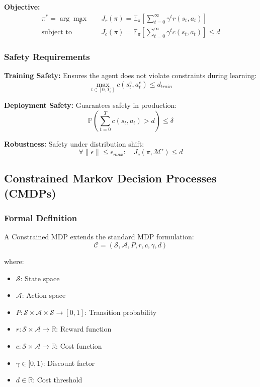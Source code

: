 \documentclass[12pt]{article}
\begin{document}
{{{{\textbf{Objective:}
\begin{align}
\pi^* = \arg\max_{\pi} \quad & J_r(\pi) = \mathbb{E}_{\pi}\left[\sum_{t=0}^{\infty} \gamma^t r(s_t, a_t)\right] \\
\text{subject to} \quad & J_c(\pi) = \mathbb{E}_{\pi}\left[\sum_{t=0}^{\infty} \gamma^t c(s_t, a_t)\right] \leq d
\end{align}

\subsubsection{Safety Requirements}

\textbf{Training Safety:} Ensures the agent does not violate constraints during learning:
\begin{equation}
\max_{t \in [0, T_e]} c(s_t^e, a_t^e) \leq d_{train}
\end{equation}

\textbf{Deployment Safety:} Guarantees safety in production:
\begin{equation}
\mathbb{P}\left(\sum_{t=0}^{T} c(s_t, a_t) > d\right) \leq \delta
\end{equation}

\textbf{Robustness:} Safety under distribution shift:
\begin{equation}
\forall \|\epsilon\| \leq \epsilon_{max}: \quad J_c(\pi, \mathcal{M}') \leq d
\end{equation}

\subsection{Constrained Markov Decision Processes (CMDPs)}

\subsubsection{Formal Definition}

A Constrained MDP extends the standard MDP formulation:
\begin{equation}
\mathcal{C} = (\mathcal{S}, \mathcal{A}, P, r, c, \gamma, d)
\end{equation}

where:
\begin{itemize}
\item $\mathcal{S}$: State space
\item $\mathcal{A}$: Action space  
\item $P: \mathcal{S} \times \mathcal{A} \times \mathcal{S} \rightarrow [0,1]$: Transition probability
\item $r: \mathcal{S} \times \mathcal{A} \rightarrow \mathbb{R}$: Reward function
\item $c: \mathcal{S} \times \mathcal{A} \rightarrow \mathbb{R}$: Cost function
\item $\gamma \in [0,1)$: Discount factor
\item $d \in \mathbb{R}$: Cost threshold
\end{itemize}

}}}}
\end{document}
